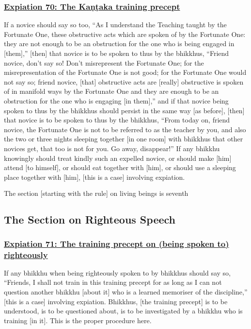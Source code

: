 \subsubsection*{\hyperref[pac70]{Expiation 70: The Kaṇṭaka training precept}}
\label{exp70}
If a novice should say so too, ``As I understand the Teaching taught by the Fortunate One, these obstructive acts which are spoken of by the Fortunate One: they are not enough to be an obstruction for the one who is being engaged in [them],'' [then] that novice is to be spoken to thus by the bhikkhus, ``Friend novice, don't say so! Don't misrepresent the Fortunate One; for the misrepresentation of the Fortunate One is not good; for the Fortunate One would not say so; friend novice, [that] obstructive acts are [really] obstructive is spoken of in manifold ways by the Fortunate One and they are enough to be an obstruction for the one who is engaging [in them],'' and if that novice being spoken to thus by the bhikkhus should persist in the same way [as before], [then] that novice is to be spoken to thus by the bhikkhus, ``From today on, friend novice, the Fortunate One is not to be referred to as the teacher by you, and also the two or three nights sleeping together [in one room] with bhikkhus that other novices get, that too is not for you. Go away, disappear!'' If any bhikkhu knowingly should treat kindly such an expelled novice, or should make [him] attend [to himself], or should eat together with [him], or should use a sleeping place together with [him], [this is a case] involving expiation.

\begin{center}
	The section [starting with the rule] on living beings is seventh
\end{center}



\setsubsecheadstyle{\subsectionFmt}
\subsection{The Section on Righteous Speech}

\subsubsection*{\hyperref[pac71]{Expiation 71: The training precept on (being spoken to) righteously}}
\label{exp71}
If any bhikkhu when being righteously spoken to by bhikkhus should say so, ``Friends, I shall not train in this training precept for as long as I can not question another bhikkhu [about it] who is a learned memoriser of the discipline,'' [this is a case] involving expiation. Bhikkhus, [the training precept] is to be understood, is to be questioned about, is to be investigated by a bhikkhu who is training [in it]. This is the proper procedure here.



